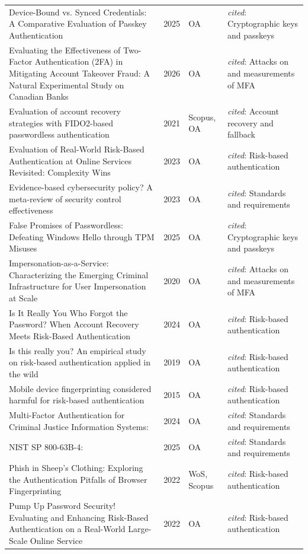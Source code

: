 \begin{longtable}{@{}%
  >{\raggedright\arraybackslash}p{}c%
  >{\raggedright\arraybackslash}p{}%
  >{\raggedright\arraybackslash}p{}@{}}
Device-Bound vs. Synced Credentials: A Comparative Evaluation of Passkey Authentication & 2025 & OA & \emph{cited}: Cryptographic keys and passkeys \\
Evaluating the Effectiveness of Two-Factor Authentication (2FA) in Mitigating Account Takeover Fraud: A Natural Experimental Study on Canadian Banks & 2026 & OA & \emph{cited}: Attacks on and measurements of MFA \\
Evaluation of account recovery strategies with FIDO2-based passwordless authentication & 2021 & Scopus, OA & \emph{cited}: Account recovery and fallback \\
Evaluation of Real-World Risk-Based Authentication at Online Services Revisited: Complexity Wins & 2023 & OA & \emph{cited}: Risk-based authentication \\
Evidence-based cybersecurity policy? A meta-review of security control effectiveness & 2023 & OA & \emph{cited}: Standards and requirements \\
False Promises of Passwordless: Defeating Windows Hello through TPM Misuses & 2025 & OA & \emph{cited}: Cryptographic keys and passkeys \\
Impersonation-as-a-Service: Characterizing the Emerging Criminal Infrastructure for User Impersonation at Scale & 2020 & OA & \emph{cited}: Attacks on and measurements of MFA \\
Is It Really You Who Forgot the Password? When Account Recovery Meets Risk-Based Authentication & 2024 & OA & \emph{cited}: Risk-based authentication \\
Is this really you? An empirical study on risk-based authentication applied in the wild & 2019 & OA & \emph{cited}: Risk-based authentication \\
Mobile device fingerprinting considered harmful for risk-based authentication & 2015 & OA & \emph{cited}: Risk-based authentication \\
Multi-Factor Authentication for Criminal Justice Information Systems: & 2024 & OA & \emph{cited}: Standards and requirements \\
NIST SP 800-63B-4: & 2025 & OA & \emph{cited}: Standards and requirements \\
Phish in Sheep's Clothing: Exploring the Authentication Pitfalls of Browser Fingerprinting & 2022 & WoS, Scopus & \emph{cited}: Risk-based authentication \\
Pump Up Password Security! Evaluating and Enhancing Risk-Based Authentication on a Real-World Large-Scale Online Service & 2022 & OA & \emph{cited}: Risk-based authentication \\

\end{longtable}
